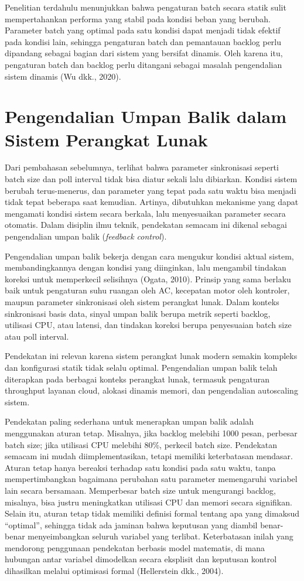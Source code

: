 Penelitian terdahulu menunjukkan bahwa pengaturan batch secara statik sulit mempertahankan performa yang stabil pada kondisi beban yang berubah.
Parameter batch yang optimal pada satu kondisi dapat menjadi tidak efektif pada kondisi lain, sehingga pengaturan batch dan pemantauan backlog perlu dipandang sebagai bagian dari sistem yang bersifat dinamis.
Oleh karena itu, pengaturan batch dan backlog perlu ditangani sebagai masalah pengendalian sistem dinamis (Wu dkk., 2020).

\section{Pengendalian Umpan Balik dalam Sistem Perangkat Lunak}

Dari pembahasan sebelumnya, terlihat bahwa parameter sinkronisasi seperti batch size dan poll interval tidak bisa diatur sekali lalu dibiarkan.
Kondisi sistem berubah terus-menerus, dan parameter yang tepat pada satu waktu bisa menjadi tidak tepat beberapa saat kemudian.
Artinya, dibutuhkan mekanisme yang dapat mengamati kondisi sistem secara berkala, lalu menyesuaikan parameter secara otomatis.
Dalam disiplin ilmu teknik, pendekatan semacam ini dikenal sebagai pengendalian umpan balik (\emph{feedback control}).

Pengendalian umpan balik bekerja dengan cara mengukur kondisi aktual sistem, membandingkannya dengan kondisi yang diinginkan, lalu mengambil tindakan koreksi untuk memperkecil selisihnya (Ogata, 2010).
Prinsip yang sama berlaku baik untuk pengaturan suhu ruangan oleh AC, kecepatan motor oleh kontroler, maupun parameter sinkronisasi oleh sistem perangkat lunak.
Dalam konteks sinkronisasi basis data, sinyal umpan balik berupa metrik seperti backlog, utilisasi CPU, atau latensi, dan tindakan koreksi berupa penyesuaian batch size atau poll interval.

Pendekatan ini relevan karena sistem perangkat lunak modern semakin kompleks dan konfigurasi statik tidak selalu optimal.
Pengendalian umpan balik telah diterapkan pada berbagai konteks perangkat lunak, termasuk pengaturan throughput layanan cloud, alokasi dinamis memori, dan pengendalian autoscaling sistem.

Pendekatan paling sederhana untuk menerapkan umpan balik adalah menggunakan aturan tetap.
Misalnya, jika backlog melebihi 1000 pesan, perbesar batch size; jika utilisasi CPU melebihi 80\%, perkecil batch size.
Pendekatan semacam ini mudah diimplementasikan, tetapi memiliki keterbatasan mendasar.
Aturan tetap hanya bereaksi terhadap satu kondisi pada satu waktu, tanpa mempertimbangkan bagaimana perubahan satu parameter memengaruhi variabel lain secara bersamaan.
Memperbesar batch size untuk mengurangi backlog, misalnya, bisa justru meningkatkan utilisasi CPU dan memori secara signifikan.
Selain itu, aturan tetap tidak memiliki definisi formal tentang apa yang dimaksud ``optimal'', sehingga tidak ada jaminan bahwa keputusan yang diambil benar-benar menyeimbangkan seluruh variabel yang terlibat.
Keterbatasan inilah yang mendorong penggunaan pendekatan berbasis model matematis, di mana hubungan antar variabel dimodelkan secara eksplisit dan keputusan kontrol dihasilkan melalui optimisasi formal (Hellerstein dkk., 2004).

